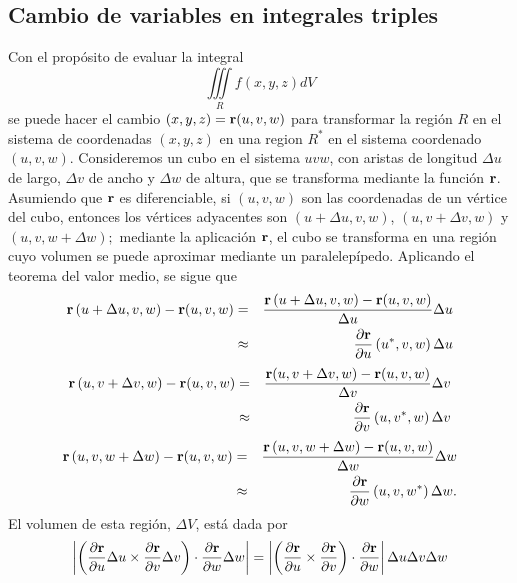 \subsection{Cambio de variables en integrales triples}
Con el propósito de evaluar la integral
$$\iiint\limits_{R}f(x,y,z) dV$$
se puede hacer el cambio $(x,y,z) ={\bf r}(u,v,w)$ para transformar la región $R$ en el sistema
de coordenadas $(x,y,z) $ en una region $R^{\ast }$ en el sistema coordenado  $(u,v,w) $.
Consideremos un cubo en el sistema $uvw$, con aristas de longitud $\Delta u$ de largo, $\Delta v$ de ancho y $\Delta w$ de altura, que se transforma mediante la función ${\bf r}$.
Asumiendo que ${\bf r}$ es diferenciable,
si $(u,v,w) $ son las coordenadas de un vértice del cubo, entonces los vértices
adyacentes son $\left( u+\Delta u,v,w\right) $, $\left( u,v+\Delta v,w\right)$ y $\left( u,v,w+\Delta w\right) ;$ mediante la aplicación ${\bf r}$, el cubo se transforma en una región cuyo volumen se puede aproximar mediante un \mbox{paralelepípedo}.
Aplicando el teorema del valor medio, se sigue que
\begin{eqnarray*}
{\bf r}\left( u+\Delta u,v,w\right) -{\bf r}(u,v,w) &=& \frac{{\bf r}\left( u+\Delta u,v,w\right) -{\bf r}(u,v,w) }{\Delta u}\Delta u \\
&\approx &   \frac{\partial {\bf r}}{\partial u}\left( u^{\ast},v,w\right) \Delta u
\end{eqnarray*}
\begin{eqnarray*}
{\bf r}\left( u,v+\Delta v,w\right) -{\bf r}(u,v,w) &=& \frac{{\bf r}(u,v+\Delta v,w)-{\bf r}(u,v,w)}{\Delta v}\Delta v \\
&\approx& \frac{\partial{\bf r}}{\partial v}\left( u,v^{\ast},w\right)\Delta v
\end{eqnarray*}
\begin{eqnarray*}
{\bf r}\left( u,v,w+\Delta w\right) -{\bf r}(u,v,w) &=& \frac{{\bf r}\left(
u,v,w+\Delta w\right) -{\bf r}(u,v,w)}{\Delta w}\Delta w \\
&\approx & \frac{\partial {\bf r}}{\partial w}\left( u,v,w^{\ast}\right) \Delta w.
\end{eqnarray*}
El volumen de esta región, $\Delta V$, está dada por
\begin{equation}
\left\vert \left( \frac{\partial {\bf r}}{\partial u}\Delta u\times
\frac{\partial {\bf r}}{\partial v}\Delta v\right) \cdot \frac{\partial {\bf r}}{\partial w}\Delta w\right\vert =\left\vert \left( \frac{\partial {\bf r}}{\partial u}\times \frac{\partial {\bf r}}{\partial v}\right) \cdot \frac{\partial {\bf r}}{\partial w}\right\vert \Delta u\Delta v\Delta w
\end{equation}

